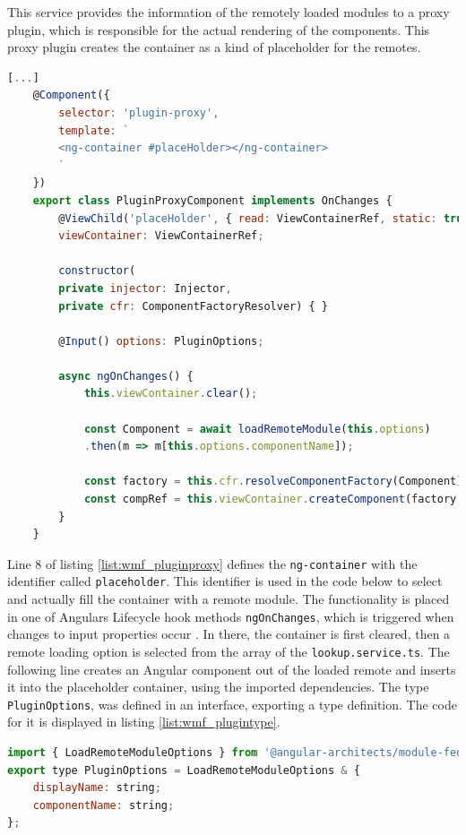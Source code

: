 This service provides the information of the remotely loaded modules to a proxy plugin, which is responsible for the actual rendering of the components. 
This proxy plugin creates the container as a kind of placeholder for the remotes. \cite{wmf_angular_dynamicfederation}

\begin{lstlisting}[language=JavaScript, caption=Content of \texttt{plugin-proxy.component.ts} for remote module loading in shell applications, label=list:wmf_pluginproxy,  xleftmargin=.0\textwidth, xrightmargin=.0\textwidth]
	[...]	
	@Component({
		selector: 'plugin-proxy',
		template: `
		<ng-container #placeHolder></ng-container>
		`
	})
	export class PluginProxyComponent implements OnChanges {
		@ViewChild('placeHolder', { read: ViewContainerRef, static: true })
		viewContainer: ViewContainerRef;
		
		constructor(
		private injector: Injector,
		private cfr: ComponentFactoryResolver) { }
		
		@Input() options: PluginOptions;
		
		async ngOnChanges() {
			this.viewContainer.clear();
			
			const Component = await loadRemoteModule(this.options)
			.then(m => m[this.options.componentName]);
			
			const factory = this.cfr.resolveComponentFactory(Component);
			const compRef = this.viewContainer.createComponent(factory, null, this.injector);		
		}
	}
\end{lstlisting}

Line 8 of listing \ref{list:wmf_pluginproxy} defines the \texttt{ng-container} with the identifier called \texttt{placeholder}. 
This identifier is used in the code below to select and actually fill the container with a remote module. 
The functionality is placed in one of Angulars Lifecycle hook methods \texttt{ngOnChanges}, which is triggered when changes to input properties occur \cite{wmf_angular_lifecyclehooks}.
In there, the container is first cleared, then a remote loading option is selected from the array of the \texttt{lookup.service.ts}. 
The following line creates an Angular component out of the loaded remote and inserts it into the placeholder container, using the imported dependencies.
The type \texttt{PluginOptions}, was defined in an interface, exporting a type definition. 
The code for it is displayed in listing \ref{list:wmf_plugintype}.

\begin{lstlisting}[language=JavaScript, caption=Content of \texttt{plugin.ts} for remote module loading in shell applications, label=list:wmf_plugintype,  xleftmargin=.0\textwidth, xrightmargin=.0\textwidth]
import { LoadRemoteModuleOptions } from '@angular-architects/module-federation';
export type PluginOptions = LoadRemoteModuleOptions & {
	displayName: string;
	componentName: string;
};
\end{lstlisting}

